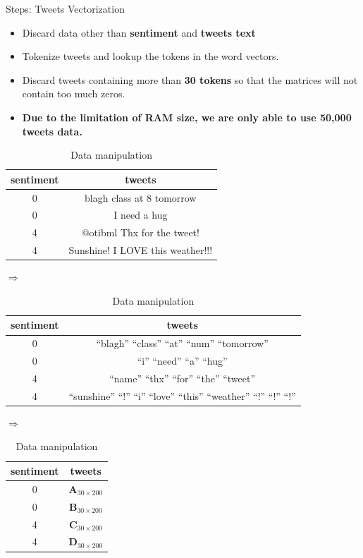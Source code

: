 \documentclass{beamer}
\begin{document}
\begin{frame}{Steps: Tweets Vectorization}
	\begin{itemize}
		\item Discard data other than \textbf{sentiment} and \textbf{tweets text}
		\item Tokenize tweets and lookup the tokens in the word vectors.
		\item Discard tweets containing more than \textbf{30 tokens} so that the matrices will not contain too much zeros.
		\item \textbf{Due to the limitation of RAM size, we are only able to use 50,000 tweets data.} 

	\end{itemize}
	\begin{table}[htpb]
		\tiny
		\centering
		\caption{Data manipulation}
		\label{tab:dataMan}
		\begin{tabular}{c c}
			sentiment & tweets \\
			\hline
			 0 & blagh class at 8 tomorrow  \\
			 0 & I need a hug  \\
			 4 & @otibml Thx for the tweet!  \\
			 4 & Sunshine! I LOVE this weather!!!  \\
		\end{tabular}
		$\Rightarrow$
		\begin{tabular}{c c}
			sentiment & tweets \\
			\hline
			 0 & ``blagh'' ``class'' ``at'' ``num'' ``tomorrow'' \\
			 0 & ``i'' ``need'' ``a'' ``hug'' \\
			 4 & ``name'' ``thx'' ``for'' ``the'' ``tweet''\\
			 4 & ``sunshine'' ``!'' ``i'' ``love'' ``this'' ``weather'' ``!'' ``!'' ``!'' \\
		\end{tabular}
		$\Rightarrow$
		\begin{tabular}{c c}
			sentiment & tweets \\
			\hline
			0 & $ \mathbf{A}_{ 30 \times 200 }  $ \\
			0 & $ \mathbf{B}_{ 30 \times 200 }  $ \\
			4 & $ \mathbf{C}_{ 30 \times 200 }  $ \\
			4 & $ \mathbf{D}_{ 30 \times 200 }  $ \\
		\end{tabular}
	\end{table}
	
\end{frame}
\end{document}
